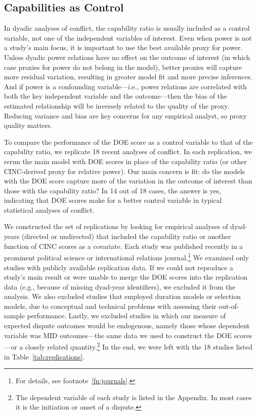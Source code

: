 \subsection{Capabilities as Control}

In dyadic analyses of conflict, the capability ratio is usually included as a control variable, not one of the independent variables of interest.
Even when power is not a study's main focus, it is important to use the best available proxy for power.
Unless dyadic power relations have no effect on the outcome of interest (in which case proxies for power do not belong in the model), better proxies will capture more residual variation, resulting in greater model fit and more precise inferences.
And if power is a confounding variable---i.e., power relations are correlated with both the key independent variable and the outcome---then the bias of the estimated relationship will be inversely related to the quality of the proxy.
Reducing variance and bias are key concerns for any empirical analyst, so proxy quality matters.

To compare the performance of the DOE score as a control variable to that of the capability ratio, we replicate 18 recent analyses of conflict.
In each replication, we rerun the main model with DOE scores in place of the capability ratio (or other CINC-derived proxy for relative power).
Our main concern is fit: do the models with the DOE score capture more of the variation in the outcome of interest than those with the capability ratio?
In 14 out of 18 cases, the answer is yes, indicating that DOE scores make for a better control variable in typical statistical analyses of conflict.

We constructed the set of replications by looking for empirical analyses of dyad-years (directed or undirected) that included the capability ratio or another function of CINC scores as a covariate.
Each study was published recently in a prominent political science or international relations journal.\footnote{%
  For details, see footnote~\ref{fn:journals}.
}
We examined only studies with publicly available replication data.
If we could not reproduce a study's main result or were unable to merge the DOE scores into the replication data (e.g., because of missing dyad-year identifiers), we excluded it from the analysis.
We also excluded studies that employed duration models or selection models, due to conceptual and technical problems with assessing their out-of-sample performance.
Lastly, we excluded studies in which our measure of expected dispute outcomes would be endogenous, namely those whose dependent variable was MID outcomes---the same data we used to construct the DOE scores---or a closely related quantity.\footnote{%
  The dependent variable of each study is listed in the Appendix.
  In most cases it is the initiation or onset of a dispute.
}
In the end, we were left with the 18 studies listed in Table~\ref{tab:replications}.

